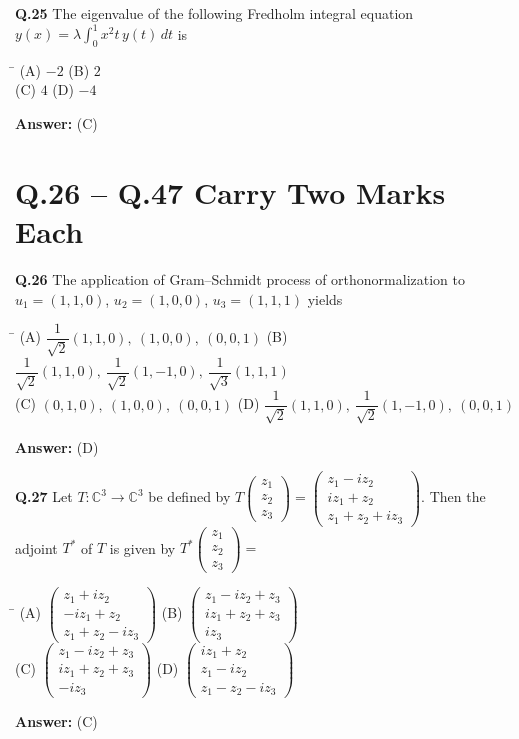 \documentclass[11pt,a4paper]{article}
\newcommand{\optsfourA}[4]{%
  \begin{tabbing}
    \hspace{0.48\linewidth}\=\kill
    (A) #1 \> (B) #2 \\[2pt]
    (C) #3 \> (D) #4
  \end{tabbing}%
}
\newcommand{\ans}[1]{\textbf{Answer:} #1\par\medskip}
\begin{document}
\textbf{Q.25} The eigenvalue of the following Fredholm integral equation $y(x) = \lambda \displaystyle\int_0^1 x^2 t\,y(t)\,dt$ is
\optsfourA{$-2$}{$2$}{$4$}{$-4$}
\ans{(C)}

\section*{Q.26 -- Q.47 Carry Two Marks Each}

\textbf{Q.26} The application of Gram--Schmidt process of orthonormalization to $u_1 = (1, 1, 0)$, $u_2 = (1, 0, 0)$, $u_3 = (1, 1, 1)$ yields
\optsfourA{$\dfrac{1}{\sqrt{2}}(1, 1, 0),\ (1, 0, 0),\ (0, 0, 1)$}{$\dfrac{1}{\sqrt{2}}(1, 1, 0),\ \dfrac{1}{\sqrt{2}}(1, -1, 0),\ \dfrac{1}{\sqrt{3}}(1, 1, 1)$}{$(0, 1, 0),\ (1, 0, 0),\ (0, 0, 1)$}{$\dfrac{1}{\sqrt{2}}(1, 1, 0),\ \dfrac{1}{\sqrt{2}}(1, -1, 0),\ (0, 0, 1)$}
\ans{(D)}

\textbf{Q.27} Let $T : \mathbb{C}^3 \to \mathbb{C}^3$ be defined by $T\!\begin{pmatrix} z_1 \\ z_2 \\ z_3 \end{pmatrix} = \begin{pmatrix} z_1 - i z_2 \\ i z_1 + z_2 \\ z_1 + z_2 + i z_3 \end{pmatrix}$. Then the adjoint $T^*$ of $T$ is given by $T^*\!\begin{pmatrix} z_1 \\ z_2 \\ z_3 \end{pmatrix} =$
\optsfourA{$\begin{pmatrix} z_1 + i z_2 \\ -i z_1 + z_2 \\ z_1 + z_2 - i z_3 \end{pmatrix}$}{$\begin{pmatrix} z_1 - i z_2 + z_3 \\ i z_1 + z_2 + z_3 \\ i z_3 \end{pmatrix}$}{$\begin{pmatrix} z_1 - i z_2 + z_3 \\ i z_1 + z_2 + z_3 \\ -i z_3 \end{pmatrix}$}{$\begin{pmatrix} i z_1 + z_2 \\ z_1 - i z_2 \\ z_1 - z_2 - i z_3 \end{pmatrix}$}
\ans{(C)}
\end{document}
